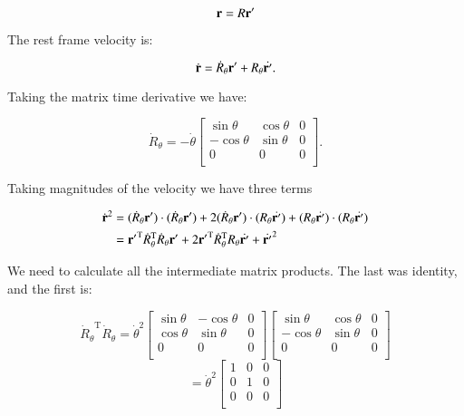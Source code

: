 \documentclass{article}      %
\newcommand{\dt}[1]{\dot{#1}}
\newcommand{\transpose}[1]{{#1}^{\text{T}}}
\begin{document}
\[
\mathbf{r} = R\mathbf{r}'
\]

%

The rest frame velocity is:

\[
\dt{\Br} = \dt{R}_{\theta} \Br' + R_{\theta} \dt{\Br'}.
\]

Taking the matrix time derivative we have:

\[
\dt{R}_{\theta} =
-\dt{\theta}
\begin{bmatrix}
\sin \theta & \cos \theta & 0 \\
-\cos \theta & \sin \theta & 0 \\
0 & 0 & 0 \\
\end{bmatrix}.
\]

Taking magnitudes of the velocity we have three terms

\begin{align*}
\dt{\Br}^2 
&= 
(\dt{R}_{\theta} \Br') \cdot (\dt{R}_{\theta} \Br')
+2 (\dt{R}_{\theta} \Br') \cdot (R_{\theta} \dt{\Br'})
+(R_{\theta} \dt{\Br'}) \cdot (R_{\theta} \dt{\Br'}) \\
&= 
\transpose{\Br'}\transpose{\dt{R}_{\theta}} \dt{R}_{\theta} \Br'
+2 \transpose{\Br'} \transpose{\dt{R}_{\theta}} R_{\theta} \dt{\Br'}
+\dt{\Br'}^2 \\
\end{align*}

We need to calculate all the intermediate matrix products.  The last was 
identity, and the first is:

\[
\transpose{\dt{R}_{\theta}} \dt{R}_{\theta}
=
{\dt{\theta}}^2
\begin{bmatrix}
\sin \theta & -\cos \theta & 0 \\
\cos \theta & \sin \theta & 0 \\
0 & 0 & 0 \\
\end{bmatrix}
\begin{bmatrix}
\sin \theta & \cos \theta & 0 \\
-\cos \theta & \sin \theta & 0 \\
0 & 0 & 0 \\
\end{bmatrix}
\]
\[
=
{\dt{\theta}}^2
\begin{bmatrix}
1 & 0 & 0 \\
0 & 1 & 0 \\
0 & 0 & 0 \\
\end{bmatrix}
\]
\end{document}
